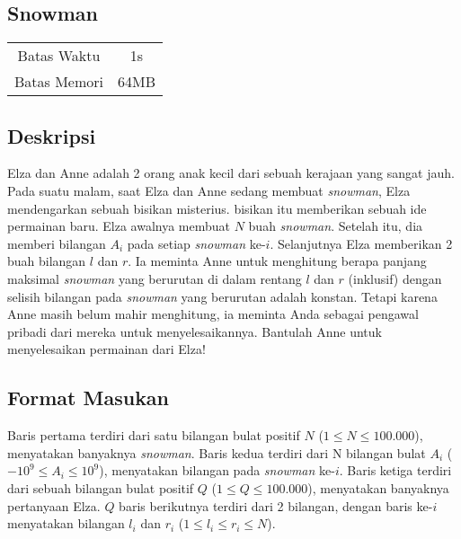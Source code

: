 \documentclass{article}
\begin{document}
\begin{center}
    \section*{Snowman} %

    \begin{tabular}{ | c c | }
        \hline
        Batas Waktu  & 1s \\    %
        Batas Memori & 64MB \\  %
        \hline
    \end{tabular}
\end{center}

\subsection*{Deskripsi}

Elza dan Anne adalah 2 orang anak kecil dari sebuah kerajaan yang sangat jauh.
Pada suatu malam, saat Elza dan Anne sedang membuat \textit{snowman}, Elza mendengarkan sebuah bisikan misterius.
bisikan itu memberikan sebuah ide permainan baru. Elza awalnya membuat $N$ buah \textit{snowman}.
Setelah itu, dia memberi bilangan $A_i$ pada setiap \textit{snowman} ke-$i$.
Selanjutnya Elza memberikan 2 buah bilangan $l$ dan $r$. Ia meminta Anne untuk menghitung berapa panjang maksimal 
\textit{snowman} yang berurutan di dalam rentang $l$ dan $r$ (inklusif) dengan selisih bilangan pada \textit{snowman} yang 
berurutan adalah konstan. Tetapi karena Anne masih belum mahir menghitung, 
ia meminta Anda sebagai pengawal pribadi dari mereka untuk menyelesaikannya.
Bantulah Anne untuk menyelesaikan permainan dari Elza!

\subsection*{Format Masukan}

Baris pertama terdiri dari satu bilangan bulat positif $N$ ($1 \leq N \leq 100.000$), menyatakan banyaknya \textit{snowman}.
Baris kedua terdiri dari N bilangan bulat $A_i$ ($-10^{9} \leq A_i \leq 10^{9}$), menyatakan bilangan pada \textit{snowman} ke-$i$.
Baris ketiga terdiri dari sebuah bilangan bulat positif $Q$ ($1 \leq Q \leq 100.000$), menyatakan banyaknya pertanyaan Elza.
$Q$ baris berikutnya terdiri dari 2 bilangan, dengan baris ke-$i$ menyatakan bilangan $l_i$ dan $r_i$ ($1 \leq l_i \leq r_i \leq N$).
\end{document}
